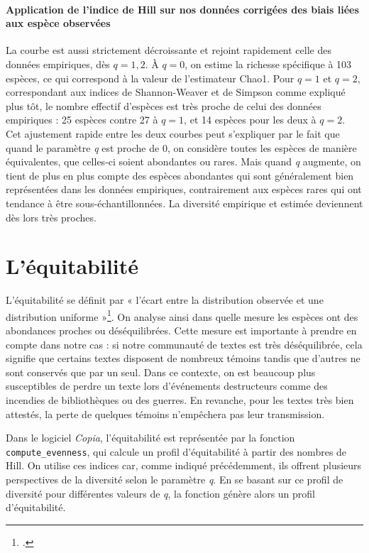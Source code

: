 \documentclass[a4paper,twoside,12pt]{book}
\begin{document}
\paragraph{Application de l'indice de Hill sur nos données corrigées des biais liées  aux espèce observées} La courbe est aussi strictement décroissante et rejoint rapidement celle des données empiriques, dès \( q = 1{,}2 \). À \( q = 0 \), on estime la richesse spécifique à 103 espèces, ce qui correspond à la valeur de l’estimateur Chao1. Pour \( q = 1 \) et \( q = 2 \), correspondant aux indices de Shannon-Weaver et de Simpson comme expliqué plus tôt, le nombre effectif d’espèces est très proche de celui des données empiriques : 25 espèces contre 27 à \( q = 1 \), et 14 espèces pour les deux à \( q = 2 \).
Cet ajustement rapide entre les deux courbes peut s'expliquer par le fait que quand le paramètre \textit{q} est proche de 0, on considère toutes les espèces de manière équivalentes, que celles-ci soient 
abondantes ou rares. Mais quand \textit{q} augmente, on tient de plus en plus compte des espèces abondantes qui sont généralement bien représentées dans les données empiriques, contrairement aux espèces rares qui ont tendance à être sous-échantillonnées. La diversité empirique et estimée deviennent dès lors très proches.

\section{L'équitabilité}

L'équitabilité se définit par « l'écart entre la distribution observée et une distribution uniforme »\footcite[chapitre Equitabilité]{MarconMesuresBioDiv2}. On analyse ainsi dans quelle mesure les espèces ont des abondances proches ou déséquilibrées. Cette mesure est  importante à prendre en compte dans notre cas : si notre communauté de textes est très déséquilibrée, cela signifie que certains textes disposent de nombreux témoins tandis que d'autres ne sont conservés que par un seul. Dans ce contexte, on est beaucoup plus susceptibles de perdre un texte lors d’événements destructeurs comme des incendies de bibliothèques ou des guerres. En revanche, pour les textes très bien attestés, la perte de quelques témoins n’empêchera pas leur transmission.

Dans le logiciel \textit{Copia}, l’équitabilité est représentée par la fonction \texttt{compute\_evenness}, qui calcule un profil d’équitabilité à partir des nombres de Hill. On utilise ces indices car, comme indiqué précédemment, ils offrent plusieurs perspectives de la diversité selon le paramètre \textit{q}. En se basant sur ce profil de diversité pour différentes valeurs de \textit{q}, la fonction génère alors un profil d’équitabilité.
\end{document}
